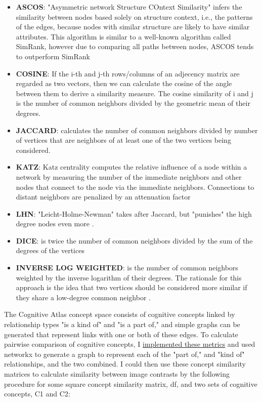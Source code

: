 \documentclass{report}
\begin{document}
\begin{itemize}
\item
  \textbf{ASCOS}: "Asymmetric network Structure COntext Similarity" infers the similarity between nodes based solely on structure context, i.e., the patterns of the edges, because nodes with similar structure are likely to have similar attributes. This algorithm is similar to a well-known algorithm called SimRank, however due to comparing all paths between nodes, ASCOS tends to outperform SimRank \cite{6785743}
\item
  \textbf{COSINE}: If the i-th and j-th rows/columns of an adjecency matrix are regarded as two vectors, then we can calculate the cosine of the angle between them to derive a similarity measure. The cosine similarity of i and j is the number of common neighbors divided by the geometric mean of their degrees. \cite{Salton:1989:ATP:77013}
\item
  \textbf{JACCARD}: calculates the number of common neighbors divided by number of vertices that are neighbors of at least one of the two vertices being considered. \cite{jaccard}
\item
  \textbf{KATZ}: Katz centrality computes the relative influence of a node within a network by measuring the number of the immediate neighbors and other nodes that connect to the node via the immediate neighbors. Connections to distant neighbors are penalized by an attenuation factor \cite{Hanneman_undated-ou}
\item
  \textbf{LHN}: "Leicht-Holme-Newman" takes after Jaccard, but "punishes" the high degree nodes even more \cite{Leicht2005-dv}.
\item 
  \textbf{DICE}: is twice the number of common neighbors divided by the sum of the degrees of the vertices \cite{10.2307/1932409}
\item
  \textbf{INVERSE LOG WEIGHTED}: is the number of common neighbors weighted by the inverse logarithm of their degrees. The rationale for this approach is the idea that two vertices should be considered more similar if they share a low-degree common neighbor \cite{Adamic2003-mj}.
\end{itemize}

The Cognitive Atlas concept space consists of cognitive concepts linked by relationship types "is a kind of" and "is a part of," and simple graphs can be generated that represent links with one or both of these edges. To calculate pairwise comparison of cognitive concepts, I \href{https://github.com/vsoch/semantic-image-comparison/blob/master/analysis/graph/similarity.py}{implemented these metrics} and used networkx \cite{hagberg-2008-exploring} to generate a graph to represent each of the "part of," and "kind of" relationships, and the two combined. I could then use these concept similarity matrices to calculate similarity between image contrasts by the following procedure for some square concept similarity matrix, df, and two sets of cognitive concepts, C1 and C2: \newline
\end{document}
